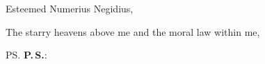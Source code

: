 




\begin{hpxlttr}
    \opening{Esteemed Numerius Negidius,}

    \kant[1-2]

    \closing{The starry heavens above me and the moral law within me,}

    \ps{\textbf{P.\,S.}: \kant[42][1]}

\end{hpxlttr}
